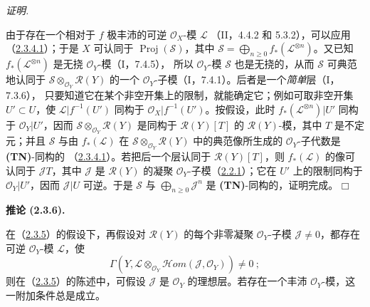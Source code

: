 \documentclass[UTF8,fontset=none,11pt,oneside,openany]{ctexbook}
\providecommand{\square}{\mdlgwhtsquare}
\newenvironment{corollary}[1][]{%
  \par\medskip\noindent\textbf{推论 (#1).}\ %
}{\par}
\newenvironment{proof}{%
  \par\smallskip\noindent\textit{证明.}\ %
}{\hfill$\square$\par}
\let\EGAOriginalLabel\label
\renewcommand{\label}[1]{\phantomsection\EGAOriginalLabel{#1}}
\begin{document}
\begin{proof}
由于存在一个相对于 $f$ 极丰沛的可逆 $\mathcal O_X$-模 $\mathcal L$
（II，4.4.2 和 5.3.2），可以应用
（\hyperref[III.2.3.4.1-fr]{2.3.4.1}）；于是 $X$ 可认同于
$\operatorname{Proj}(\mathcal S)$，其中
$\mathcal S=\bigoplus_{n\geq0}f_*(\mathcal L^{\otimes n})$。又已知
$f_*(\mathcal L^{\otimes n})$ 是无挠 $\mathcal O_Y$-模（I，7.4.5），
所以 $\mathcal O_Y$-模 $\mathcal S$ 也是无挠的，从而 $\mathcal S$
可典范地认同于
$\mathcal S\otimes_{\mathcal O_Y}\mathcal R(Y)$ 的一个
$\mathcal O_Y$-子模（I，7.4.1）。后者是一个\emph{简单}层（I，7.3.6），
只要知道它在某个非空开集上的限制，就能确定它；例如可取非空开集
$U'\subset U$，使 $\mathcal L|f^{-1}(U')$ 同构于
$\mathcal O_X|f^{-1}(U')$。按假设，此时
$f_*(\mathcal L^{\otimes n})|U'$ 同构于 $\mathcal O_Y|U'$，因而
$\mathcal S\otimes_{\mathcal O_Y}\mathcal R(Y)$ 是同构于
$\mathcal R(Y)[T]$ 的 $\mathcal R(Y)$-模，其中 $T$ 是不定元；并且
$\mathcal S$ 与由 $f_*(\mathcal L)$ 在
$\mathcal S\otimes_{\mathcal O_Y}\mathcal R(Y)$ 中的典范像所生成的
$\mathcal O_Y$-子代数是 \textbf{(TN)}-同构的
（\hyperref[III.2.3.4.1-fr]{2.3.4.1}）。若把后一个层认同于
$\mathcal R(Y)[T]$，则 $f_*(\mathcal L)$ 的像可认同于
$\mathcal J T$，其中 $\mathcal J$ 是 $\mathcal R(Y)$ 的凝聚
$\mathcal O_Y$-子模（\hyperref[III.2.2.1-fr]{2.2.1}）；它在 $U'$
上的限制同构于 $\mathcal O_Y|U'$，因而 $\mathcal J|U$ 可逆。于是
$\mathcal S$ 与 $\bigoplus_{n\geq0}\mathcal J^n$ 是
\textbf{(TN)}-同构的，证明完成。
\end{proof}

\begin{corollary}[2.3.6]
\label{III.2.3.6-fr}
在（\hyperref[III.2.3.5-fr]{2.3.5}）的假设下，再假设对
$\mathcal R(Y)$ 的每个非零凝聚 $\mathcal O_Y$-子模
$\mathcal J\neq0$，都存在可逆 $\mathcal O_Y$-模 $\mathcal L$，使
\[
\Gamma(Y,\mathcal L\otimes_{\mathcal O_Y}
\mathcal{H}om(\mathcal J,\mathcal O_Y))\neq0~;
\]
则在（\hyperref[III.2.3.5-fr]{2.3.5}）的陈述中，可假设
$\mathcal J$ 是 $\mathcal O_Y$ 的理想层。若存在一个丰沛
$\mathcal O_Y$-模，这一附加条件总是成立。
\end{corollary}
\end{document}
